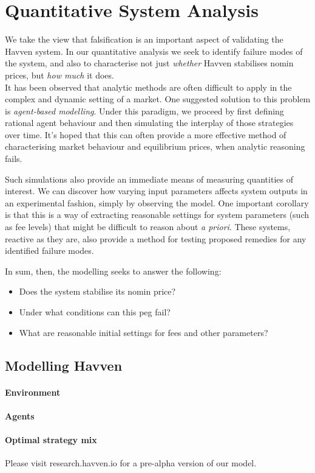\section{Quantitative System Analysis}

We take the view that falsification is an important aspect of validating
the Havven system. In our quantitative analysis we seek to identify failure modes
of the system, and also to characterise not just \textit{whether} Havven stabilises
nomin prices, but \textit{how much} it does. \\

\noindent It has been observed that analytic methods are often difficult to
apply in the complex and dynamic setting of a market.
One suggested solution to this problem is \textit{agent-based modelling}.
Under this paradigm, we proceed by first defining rational agent behaviour
and then simulating the interplay of those strategies over time.
It's hoped that this can often provide a more effective
method of characterising market behaviour and equilibrium prices,
when analytic reasoning fails.~\cite{poggio2001agent}

Such simulations also provide an immediate means of measuring
quantities of interest. We can discover how varying input parameters
affects system outputs in an experimental fashion, simply by observing
the model.
One important corollary is that this is a way of extracting reasonable
settings for system parameters (such as fee levels) that might be difficult
to reason about \textit{a priori}. These systems, reactive as they are,
also provide a method for testing proposed remedies for any identified failure
modes.

In sum, then, the modelling seeks to answer the following:

\begin{itemize}
    \item Does the system stabilise its nomin price?
    \item Under what conditions can this peg fail?
    \item What are reasonable initial settings for fees and other parameters?
\end{itemize}

\subsection{Modelling Havven}

\paragraph{Environment}

\paragraph{Agents}

\paragraph{Optimal strategy mix}

Please visit research.havven.io for a pre-alpha version of our model.

\pagebreak
